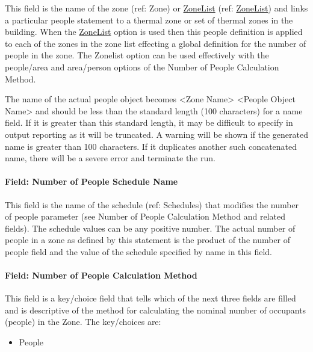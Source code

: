 This field is the name of the zone (ref: Zone) or \hyperref[zonelist]{ZoneList} (ref: \hyperref[zonelist]{ZoneList}) and links a particular people statement to a thermal zone or set of thermal zones in the building. When the \hyperref[zonelist]{ZoneList} option is used then this people definition is applied to each of the zones in the zone list effecting a global definition for the number of people in the zone. The Zonelist option can be used effectively with the people/area and area/person options of the Number of People Calculation Method.

The name of the actual people object becomes \textless{}Zone Name\textgreater{} \textless{}People Object Name\textgreater{} and should be less than the standard length (100 characters) for a name field. If it is greater than this standard length, it may be difficult to specify in output reporting as it will be truncated. A warning will be shown if the generated name is greater than 100 characters. If it duplicates another such concatenated name, there will be a severe error and terminate the run.

\paragraph{Field: Number of People Schedule Name}\label{field-number-of-people-schedule-name}

This field is the name of the schedule (ref: Schedules) that modifies the number of people parameter (see Number of People Calculation Method and related fields). The schedule values can be any positive number. The actual number of people in a zone as defined by this statement is the product of the number of people field and the value of the schedule specified by name in this field.

\paragraph{Field: Number of People Calculation Method}\label{field-number-of-people-calculation-method}

This field is a key/choice field that tells which of the next three fields are filled and is descriptive of the method for calculating the nominal number of occupants (people) in the Zone. The key/choices are:

\begin{itemize}
\tightlist
\item
  People
\end{itemize}

